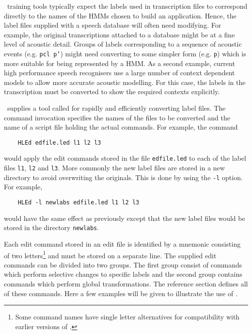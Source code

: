 
\HTK\ training tools typically expect the labels used in 
transcription files to correspond
directly to the names of the HMMs chosen to build an application.  Hence,
the label files supplied with a speech database will often need 
modifying.  For example, the original transcriptions attached to a database
might be at a fine level of acoustic detail.  Groups of labels corresponding 
to a sequence of acoustic events (e.g. \texttt{pcl p'}) might need converting
to some simpler form (e.g. \texttt{p}) which is more suitable for being
represented by a HMM.  As a second example, current high performance speech
recognisers use a large number of context dependent models to allow more
accurate acoustic modelling.  For this case, the labels in the transcription
must be converted to show the required contexts explicitly.

\HTK\ supplies a tool called  for rapidly and efficiently converting
label files. The  command invocation specifies the names of the files
to be converted and the name of a script file holding the actual
 commands.  For example, the command
\begin{verbatim}
    HLEd edfile.led l1 l2 l3
\end{verbatim}
would apply the edit commands stored in the file \texttt{edfile.led}
to each of the label files \texttt{l1}, \texttt{l2} and \texttt{l3}. More commonly
the new label files are stored in a new directory to avoid overwriting
the originals.  This is done by using the 
\texttt{-l} option.  For example,
\begin{verbatim}
    HLEd -l newlabs edfile.led l1 l2 l3
\end{verbatim}
would have the same effect as previously except that the new
label files would be stored in the directory \texttt{newlabs}.

Each edit command stored in an edit file is identified by
a mnemonic consisting of two letters\footnote{
Some command names have single 
letter alternatives for compatibility with
earlier versions of \HTK.}
and must be stored on a separate
line.  The supplied edit commands can be divided into two groups.
The first group consist of commands which perform selective 
changes to specific labels and the second group contains commands
which perform global transformations.  
The reference section defines all of these
commands.  Here a few examples will be given to illustrate the
use of .

